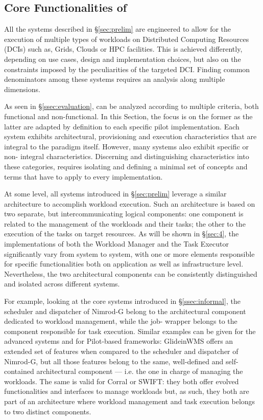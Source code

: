 \documentclass{sig-alternate}
\begin{document}
\subsection{Core Functionalities of \pilotjobs}
\label{subsec:vocab_core_functionalities}

All the \pilotjob systems described in \S\ref{sec:prelim} are engineered to
allow for the execution of multiple types of workloads on Distributed
Computing Resources (DCIs) such as, Grids, Clouds or HPC facilities. This is
achieved differently, depending on use cases, design and implementation
choices, but also on the constraints imposed by the peculiarities of the
targeted DCI. Finding common denominators among these systems requires an
analysis along multiple dimensions.

As seen in \S\ref{ssec:evaluation}, \pilotjobs can be analyzed according to
multiple criteria, both functional and non-functional. In this Section, the
focus is on the former as the latter are adapted by definition to each
specific pilot implementation. Each \pilotjob system exhibits architectural,
provisioning and execution characteristics that are integral to the \pilotjob
paradigm itself. However, many \pilotjob systems also exhibit specific or non-
integral characteristics. Discerning and distinguishing characteristics into
these categories, requires isolating and defining a minimal set of concepts
and terms that have to apply to every \pilotjob implementation.

At some level, all \pilotjob systems introduced in \S\ref{sec:prelim} leverage
a similar architecture to accomplish workload execution. Such an architecture
is based on two separate, but intercommunicating logical components: one
component is related to the management of the workloads and their tasks; the
other to the execution of the tasks on target resources. As will be shown in
\S\ref{sec:4}, the implementations of both the Workload Manager and the Task
Executor significantly vary from system to system, with one or more elements
responsible for specific functionalities both on application as well as
infrastructure level. Nevertheless, the two architectural components can be
consistently distinguished and isolated across different \pilotjob systems.

For example, looking at the core \pilotjob systems introduced in
\S\ref{ssec:informal}, the scheduler and dispatcher of Nimrod-G belong to the
architectural component dedicated to workload management, while the job-
wrapper belongs to the component responsible for task execution. Similar
examples can be given for the advanced \pilotjob systems and for Pilot-based
frameworks: GlideinWMS offers an extended set of features when compared to the
scheduler and dispatcher of Nimrod-G, but all those features belong to the
same, well-defined and self-contained architectural component --- i.e. the one
in charge of managing the workloads. The same is valid for Corral or SWIFT:
they both offer evolved functionalities and interfaces to manage workloads
but, as such, they both are part of an architecture where workload management
and task execution belongs to two distinct components.
\end{document}
